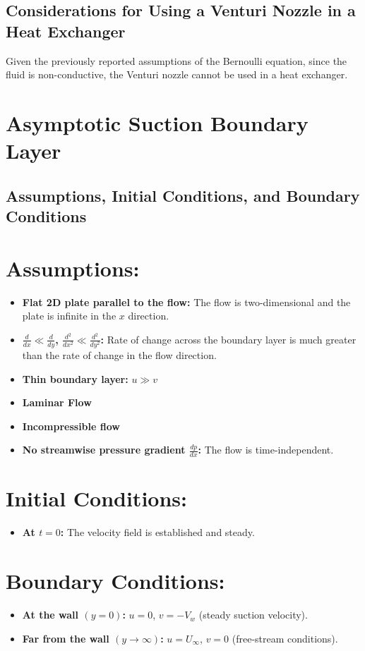 \documentclass{article}
\begin{document}
\subsection{Considerations for Using a Venturi Nozzle in a Heat Exchanger}

Given the previously reported assumptions of the Bernoulli equation, since the fluid is non-conductive, the Venturi nozzle cannot be used in a heat exchanger.


\section{Asymptotic Suction Boundary Layer}

\subsection{Assumptions, Initial Conditions, and Boundary Conditions}

\section*{Assumptions:}
\begin{itemize}
    \item \textbf{Flat 2D plate parallel to the flow:} The flow is two-dimensional and the plate is infinite in the \(x\) direction.
    \item \textbf{\(\frac{d}{dx} \ll \frac{d}{dy}\), \(\frac{d^2}{dx^2} \ll \frac{d^2}{dy^2}\):} Rate of change across the boundary layer is much greater than the rate of change in the flow direction.
    \item \textbf{Thin boundary layer:} \(u \gg v\)
    \item \textbf{Laminar Flow}
    \item \textbf{Incompressible flow}
    \item \textbf{No streamwise pressure gradient \(\frac{dp}{dx}\):} The flow is time-independent.
\end{itemize}

\section*{Initial Conditions:}
\begin{itemize}
    \item \textbf{At \(t = 0\):} The velocity field is established and steady.
\end{itemize}

\section*{Boundary Conditions:}
\begin{itemize}
    \item \textbf{At the wall \((y = 0)\):} \(u = 0\), \(v = -V_w\) (steady suction velocity).
    \item \textbf{Far from the wall \((y \rightarrow \infty)\):} \(u = U_\infty\), \(v = 0\) (free-stream conditions).
\end{itemize}
\end{document}
